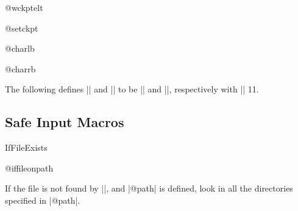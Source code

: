 \begin{multicols}
 \begin{docCommand}{@wckptelt}{}
 \end{docCommand}
    \begin{teX}
\def\@wckptelt#1{%
  \immediate\write\@partaux{%
    \string\setcounter{#1}{\the\@nameuse{c@#1}}}}
    \end{teX}


 \begin{docCommand}{@setckpt}{}
 \end{docCommand}
    \begin{teX}
\def\@setckpt#1{\global\@namedef{cp@#1}}
    \end{teX}


 \begin{docCommand}{@charlb}{}
 \begin{docCommand}{@charrb}{}
 \end{docCommand}
 \end{docCommand}
 The following defines |\@charlb| and |\@charrb| to be |{| and |}|,
 respectively with |\catcode| 11.
    \begin{teX}
{\catcode`[=1 \catcode`]=2
\catcode`{=11 \catcode`}=11
\gdef\@charlb[{]
\gdef\@charrb[}]
]%
    \end{teX}


 \subsection{Safe Input Macros}

 \begin{docCommand}{IfFileExists}{}
 \end{docCommand}

 \begin{teX}
\long{}
 \end{teX}


 \begin{docCommand}{@iffileonpath}{}
 \end{docCommand}
 If the file is not found by |\openin|, and |@path| is defined,
 look in all the directories specified in |@path|.

    \begin{teX}
\long\def\@iffileonpath#1{%
  \let\reserved@a\@secondoftwo
  \expandafter\@tfor\expandafter\reserved@b\expandafter
             :\expandafter=@path\do{%
    \openin\@inputcheck\reserved@b#1 %
    \ifeof\@inputcheck\else
      \edef\@filef@und{\reserved@b#1 }%
      \let\reserved@a\@firstoftwo%
      \closein\@inputcheck
      \@break@tfor
    \fi}%
  \reserved@a}
    \end{teX}



\end{multicols}
